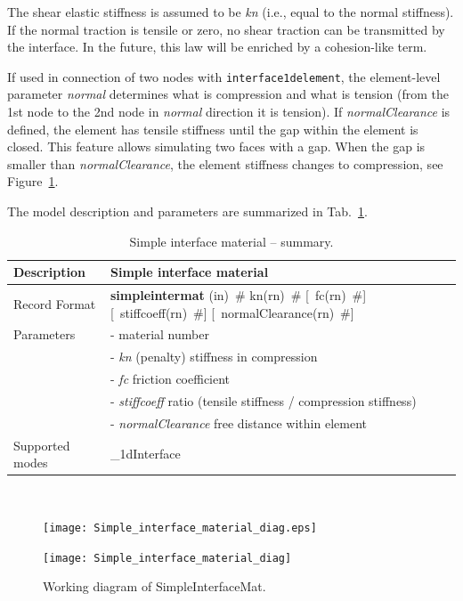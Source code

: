 \documentclass[a4paper]{article}
\newcommand{\descitem}[1]{{\noindent \bf #1}}
\newcommand{\elemparam}[2]{{{#1\tiny (#2)}~\#}}
\newcommand{\optelemparam}[2]{[{~\elemparam{#1}{#2}}]}
\newcommand{\param}[1]{{\it #1}}
\newenvironment{mmt}{\begin{tabular}{|l|p{9cm}|}}{\end{tabular}\\}
\newenvironment{mmt}{\begin{tabular}{|l|l|}}{\end{tabular}\\}
\begin{document}
The shear elastic stiffness is assumed to be \param{kn} (i.e., equal to the
normal stiffness). If the normal traction is tensile
or zero, no shear traction can be transmitted by the interface.
In the future, this law will be enriched by a cohesion-like term.

If used in connection of two nodes with {\tt interface1delement}, the element-level parameter \param{normal} determines what is compression and what is tension (from the 1st node to the 2nd node in \param{normal} direction it is tension). If \param{normalClearance} is defined, the element has tensile stiffness until the gap within the element is closed. This feature allows simulating two faces with a gap. When the gap is smaller than \param{normalClearance}, the element stiffness changes to compression, see Figure~\ref{SimpleInterfaceMat}. 

The model description and parameters are summarized in Tab.~\ref{simpleinterfacemat_table}.

\begin{table}[!htb]
\begin{mmt}
\hline
Description & Simple interface material\\
\hline
Record Format & \descitem{simpleintermat}  \elemparam{}{in}
\elemparam{kn}{rn} \optelemparam{fc}{rn} \optelemparam{stiffcoeff}{rn} \optelemparam{normalClearance}{rn}\\
Parameters &- \param{} material number\\
&- \param{kn} (penalty) stiffness in compression\\
&- \param{fc} friction coefficient\\
&- \param{stiffcoeff} ratio (tensile stiffness / compression stiffness)\\
&- \param{normalClearance} free distance within element\\

Supported modes& \_1dInterface\\
\hline
\end{mmt}
\caption{Simple interface material -- summary.}
\label{simpleinterfacemat_table}
\end{table}

\begin{figure}[!htb]
\begin{htmlonly}
  \centerline{\texttt{[image: Simple\_interface\_material\_diag.eps]}}
\end{htmlonly}
 \centerline{\texttt{[image: Simple\_interface\_material\_diag]}}
  \caption{Working diagram of SimpleInterfaceMat.}
  \label{SimpleInterfaceMat}
\end{figure}
\end{document}
